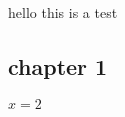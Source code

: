 \documentclass{article}
\begin{document}
hello this is a test
\subsection{chapter 1}
$x=2$
\end{document}
